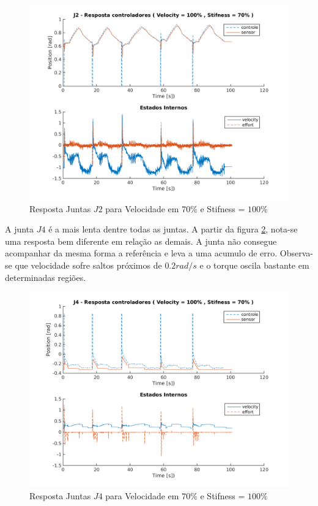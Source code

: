 \vspace{1cm}

\begin{figure}[H]
    \centering
    \includegraphics[width=0.6\linewidth,trim={2cm 1cm 2cm 2cm}]{tex/figs/squareStiffJ9stateEval_J2v100s70.png}
    \caption{Resposta Juntas $J2$ para Velocidade em $70\%$ e Stifness = $100\%$ }
    \label{fig:squareStiffJ9stateEval_J2v100s70}
\end{figure}

A junta $J4$ é a mais lenta dentre todas as juntas. A partir da figura \ref{fig:squareStiffJ9stateEval_J4v100s70}, nota-se uma resposta bem diferente em relação as demais. A junta não consegue acompanhar da mesma forma a referência e leva a uma acumulo de erro. Observa-se que velocidade sofre saltos próximos de $0.2 rad/s$ e o torque oscila bastante em determinadas regiões.

\vspace{1cm}

\begin{figure}[H]
    \centering
    \includegraphics[width=0.6\linewidth,trim={2cm 1cm 2cm 2cm}]{tex/figs/squareStiffJ9stateEval_J4v100s70.png}
    \caption{Resposta Juntas $J4$ para Velocidade em $70\%$ e Stifness = $100\%$ }
    \label{fig:squareStiffJ9stateEval_J4v100s70}
\end{figure}


